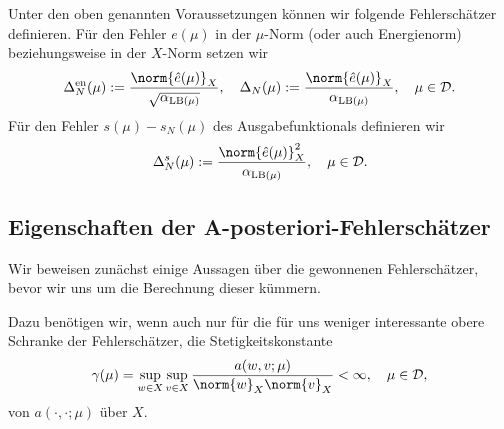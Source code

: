 \begin{Definition}
    Unter den oben genannten Voraussetzungen können wir folgende Fehlerschätzer definieren.
    Für den Fehler $e(\mu)$ in der $\mu$-Norm (oder auch Energienorm) beziehungsweise in der $X$-Norm setzen wir
    \begin{equation}
        \Delta^{\text{en}}_N(\mu) := \frac{\norm{\hat e(\mu)}_X}{\sqrt{\alpha_{\text{LB}(\mu)}}}
        , \quad
        \Delta_N(\mu) := \frac{\norm{\hat e(\mu)}_X}{\alpha_{\text{LB}(\mu)}}
        , \quad \mu \in \mathcal D.
    \end{equation}
    Für den Fehler $s(\mu) - s_N(\mu)$ des Ausgabefunktionals definieren wir
    \begin{equation}
        \Delta^s_N(\mu) := \frac{\norm{\hat e(\mu)}_X^2}{\alpha_{\text{LB}(\mu)}}, \quad \mu \in \mathcal D.
    \end{equation}
\end{Definition}


\subsection{Eigenschaften der A-posteriori-Fehlerschätzer} %
\label{sub:eigenschaften_der_a_}

Wir beweisen zunächst einige Aussagen über die gewonnenen Fehlerschätzer, bevor wir uns um die Berechnung dieser kümmern.

Dazu benötigen wir, wenn auch nur für die für uns weniger interessante obere Schranke der Fehlerschätzer, die Stetigkeitskonstante
\begin{equation}
    \gamma(\mu) = \sup_{w \in X} \sup_{v \in X} \frac{a(w, v; \mu)}{\norm{w}_X \norm{v}_X} < \infty, \quad \mu \in \mathcal D,
\end{equation}
von $a(\cdot, \cdot; \mu)$ über $X$.

